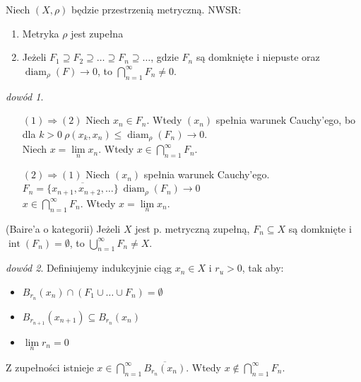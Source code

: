 \documentclass[twoside,10pt]{article}
\theoremstyle{definition}
\theoremstyle{definition}
\theoremstyle{definition}
\theoremstyle{definition}
\theoremstyle{remark}
\newtheorem*{dd}{dowód}
\theoremstyle{definition}
\theoremstyle{definition}
\theoremstyle{definition}
\theoremstyle{definition}
\theoremstyle{definition}
\theoremstyle{definition}
\begin{document}
\begin{tw} 
        Niech $(X,\rho)$ będzie przestrzenią metryczną. NWSR: 
        \begin{enumerate}[(1)]
            \item Metryka $\rho$ jest zupełna
            \item Jeżeli $F_1 \supseteq F_2 \supseteq \ldots \supseteq F_n \supseteq \ldots$, gdzie $F_n$ 
                są domknięte i niepuste oraz $\operatorname{diam}_\rho (F) \to 0$, to $\bigcap\limits_{n=1}^\infty F_n \neq 0$.
        \end{enumerate} 
\end{tw} 
\begin{dd} \hfill 
    \begin{itemize} 
        \item[$(1) \Rightarrow (2)$] Niech $x_n \in F_n$. Wtedy $(x_n)$ spełnia warunek Cauchy'ego, bo dla 
            $k > 0 \ \rho(x_k,x_n) \le \operatorname{diam}_\rho (F_n) \to 0$. \\ 
            Niech $x = \lim\limits_n x_n$. Wtedy $x \in \bigcap\limits_{n=1}^\infty F_n$.
        \item[$(2) \Rightarrow (1)$] Niech $(x_n)$ spełnia warunek Cauchy'ego. 
            $F_n = \overline{\{x_{n+1},x_{n+2},\ldots\}} \ \operatorname{diam}_\rho (F_n) \to 0$ \\
            $x \in \bigcap\limits_{n=1}^\infty F_n$. Wtedy $x = \lim\limits_n x_n$.
    \end{itemize} 
\end{dd} 
\begin{tw} (Baire'a o kategorii) Jeżeli $X$ jest p. metryczną zupełną, $F_n \subseteq X$ są domknięte i $\operatorname{int}(F_n) = \emptyset$,
to $\bigcup\limits_{n=1}^\infty F_n \neq X$. \end{tw} \begin{dd} Definiujemy indukcyjnie ciąg $x_n \in X$ i $r_u > 0$, tak aby: 
    \begin{itemize} 
        \item $B_{r_n}(x_n) \cap (F_1 \cup \ldots \cup F_n) = \emptyset$
        \item $B_{r_{n+1}}(x_{n+1}) \subseteq B_{r_n}(x_n) $
        \item $\lim\limits_n r_n = 0$
    \end{itemize} 
    Z zupełności istnieje $x \in \bigcap\limits_{n=1}^\infty \overline{B_{r_n}(x_n)}$. Wtedy 
    $x \notin \bigcap\limits_{n=1}^\infty F_n$. 
\end{dd} 
\end{document}
